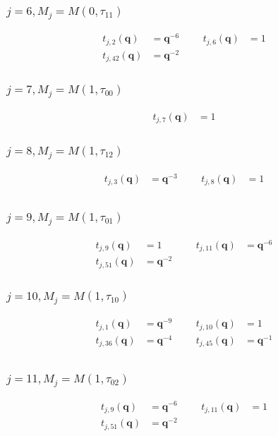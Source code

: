 \subsubsection{$j=6, M_{j}=M(0,\tau_{11})$}
\begin{align*}
t_{j,2}(\boldsymbol{q})&=\boldsymbol{q}^{-6} &&& t_{j,6}(\boldsymbol{q})&=1 \\
t_{j,42}(\boldsymbol{q})&=\boldsymbol{q}^{-2}
\end{align*}

\subsubsection{$j=7, M_{j}=M(1,\tau_{00})$}
\begin{align*}
t_{j,7}(\boldsymbol{q})&=1
\end{align*}

\subsubsection{$j=8, M_{j}=M(1,\tau_{12})$}
\begin{align*}
t_{j,3}(\boldsymbol{q})&=\boldsymbol{q}^{-3} &&& t_{j,8}(\boldsymbol{q})&=1 \\
\end{align*}

\subsubsection{$j=9, M_{j}=M(1,\tau_{01})$}
\begin{align*}
t_{j,9}(\boldsymbol{q})&=1 &&& t_{j,11}(\boldsymbol{q})&=\boldsymbol{q}^{-6} \\
t_{j,51}(\boldsymbol{q})&=\boldsymbol{q}^{-2}
\end{align*}

\subsubsection{$j=10, M_{j}=M(1,\tau_{10})$}
\begin{align*}
t_{j,1}(\boldsymbol{q})&=\boldsymbol{q}^{-9} &&& t_{j,10}(\boldsymbol{q})&=1 \\
t_{j,36}(\boldsymbol{q})&=\boldsymbol{q}^{-4} &&& t_{j,45}(\boldsymbol{q})&=\boldsymbol{q}^{-1} \\
\end{align*}

\subsubsection{$j=11, M_{j}=M(1,\tau_{02})$}
\begin{align*}
t_{j,9}(\boldsymbol{q})&=\boldsymbol{q}^{-6} &&& t_{j,11}(\boldsymbol{q})&=1 \\
t_{j,51}(\boldsymbol{q})&=\boldsymbol{q}^{-2}
\end{align*}

